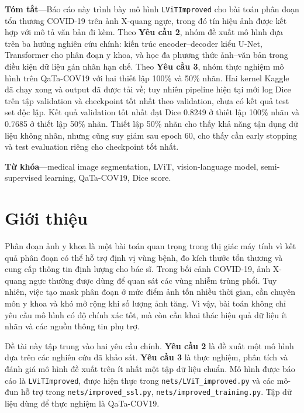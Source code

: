 \setcounter{section}{0}
\renewcommand{\thesection}{\arabic{section}}
\renewcommand{\thesubsection}{\thesection.\arabic{subsection}}
\renewcommand{\thesubsubsection}{\thesubsection.\arabic{subsubsection}}
\renewcommand{\theHsection}{\thesection}
\renewcommand{\theHsubsection}{\thesubsection}
\renewcommand{\theHsubsubsection}{\thesubsubsection}
\sloppy

\noindent\textbf{Tóm tắt}---Báo cáo này trình bày mô hình \texttt{LViTImproved} cho bài toán phân đoạn tổn thương COVID-19 trên ảnh X-quang ngực, trong đó tín hiệu ảnh được kết hợp với mô tả văn bản đi kèm. Theo \textbf{Yêu cầu 2}, nhóm đề xuất mô hình dựa trên ba hướng nghiên cứu chính: kiến trúc encoder--decoder kiểu U-Net, Transformer cho phân đoạn y khoa, và học đa phương thức ảnh--văn bản trong điều kiện dữ liệu gán nhãn hạn chế. Theo \textbf{Yêu cầu 3}, nhóm thực nghiệm mô hình trên QaTa-COV19 với hai thiết lập 100\% và 50\% nhãn. Hai kernel Kaggle đã chạy xong và output đã được tải về; tuy nhiên pipeline hiện tại mới log Dice trên tập validation và checkpoint tốt nhất theo validation, chưa có kết quả test set độc lập. Kết quả validation tốt nhất đạt Dice 0.8249 ở thiết lập 100\% nhãn và 0.7685 ở thiết lập 50\% nhãn. Thiết lập 50\% nhãn cho thấy khả năng tận dụng dữ liệu không nhãn, nhưng cũng suy giảm sau epoch 60, cho thấy cần early stopping và test evaluation riêng cho checkpoint tốt nhất.

\vspace{0.35em}
\noindent\textbf{Từ khóa}---medical image segmentation, LViT, vision-language model, semi-supervised learning, QaTa-COV19, Dice score.

\section{Giới thiệu}

Phân đoạn ảnh y khoa là một bài toán quan trọng trong thị giác máy tính vì kết quả phân đoạn có thể hỗ trợ định vị vùng bệnh, đo kích thước tổn thương và cung cấp thông tin định lượng cho bác sĩ. Trong bối cảnh COVID-19, ảnh X-quang ngực thường được dùng để quan sát các vùng nhiễm trùng phổi. Tuy nhiên, việc tạo mask phân đoạn ở mức điểm ảnh tốn nhiều thời gian, cần chuyên môn y khoa và khó mở rộng khi số lượng ảnh tăng. Vì vậy, bài toán không chỉ yêu cầu mô hình có độ chính xác tốt, mà còn cần khai thác hiệu quả dữ liệu ít nhãn và các nguồn thông tin phụ trợ.

Đề tài này tập trung vào hai yêu cầu chính. \textbf{Yêu cầu 2} là đề xuất một mô hình dựa trên các nghiên cứu đã khảo sát. \textbf{Yêu cầu 3} là thực nghiệm, phân tích và đánh giá mô hình đề xuất trên ít nhất một tập dữ liệu chuẩn. Mô hình được báo cáo là \texttt{LViTImproved}, được hiện thực trong \texttt{nets/LViT\_improved.py} và các mô-đun hỗ trợ trong \texttt{nets/improved\_ssl.py}, \texttt{nets/improved\_training.py}. Tập dữ liệu dùng để thực nghiệm là QaTa-COV19.

